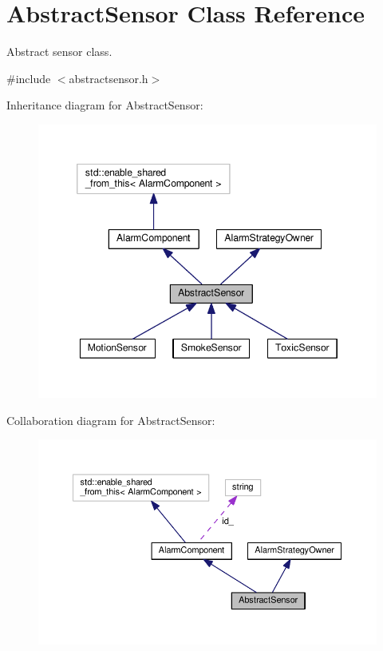 \hypertarget{classAbstractSensor}{}\section{Abstract\+Sensor Class Reference}
\label{classAbstractSensor}


Abstract sensor class.  




{\ttfamily \#include $<$abstractsensor.\+h$>$}



Inheritance diagram for Abstract\+Sensor\+:
\nopagebreak
\begin{figure}[H]
\begin{center}
\leavevmode
\includegraphics[width=346pt]{classAbstractSensor__inherit__graph}
\end{center}
\end{figure}


Collaboration diagram for Abstract\+Sensor\+:
\nopagebreak
\begin{figure}[H]
\begin{center}
\leavevmode
\includegraphics[width=350pt]{classAbstractSensor__coll__graph}
\end{center}
\end{figure}
